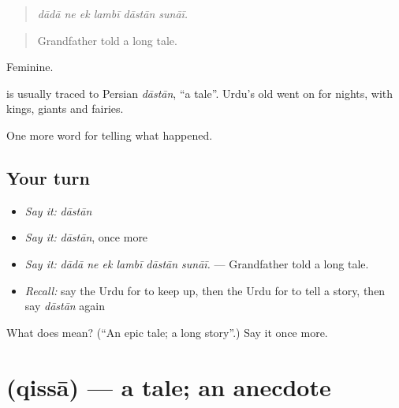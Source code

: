 \begin{quote}
     
\end{quote}

\begin{quote}
\emph{dādā ne ek lambī dāstān sunāī.}
\end{quote}

\begin{quote}
Grandfather told a long tale.
\end{quote}

Feminine.

\begin{cousinweb}
is usually traced to Persian \emph{dāstān}, \textquotedblleft{}a tale\textquotedblright{}. Urdu's old \textbf{} went on for nights, with kings, giants and fairies.
\end{cousinweb}

\begin{grammarlens}[title={What you've built}]
One more word for telling what happened.
\end{grammarlens}

\subsection*{Your turn}
\begin{itemize}
\raggedright
  \item \emph{Say it:} \emph{dāstān}
  \item \emph{Say it:} \emph{dāstān}, once more
  \item \emph{Say it:} \emph{dādā ne ek lambī dāstān sunāī.} — Grandfather told a long tale.
  \item \emph{Recall:} say the Urdu for to keep up, then the Urdu for to tell a story, then say \emph{dāstān} again
\end{itemize}

\begin{tcolorbox}[breakable,colback=teal!4,colframe=teal!35!black,title={Before you move on}]
What does  mean? (\textquotedblleft{}An epic tale; a long story\textquotedblright{}.) Say it once more.
\end{tcolorbox}
\section[\texorpdfstring{\ur{قصہ} (qissā)}{قصہ (qissā)}]{ (qissā) — a tale; an anecdote}

\label{lesson:UR-C324-qissa}



